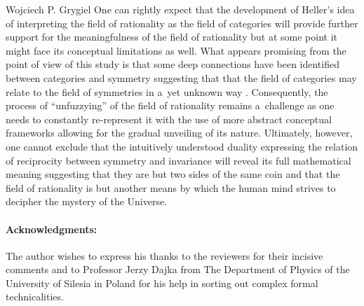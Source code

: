 \begin{artengenv}{Wojciech P. Grygiel}
One can rightly expect that the development of Heller's idea of interpreting the field of rationality as the field of categories will provide further support for the meaningfulness of the field of rationality but at some point it might face its conceptual limitations as well. What appears promising from the point of view of this study is that some deep connections have been identified between categories and symmetry suggesting that that the field of categories may relate to the field of symmetries in a~yet unknown way 
\parencite[e.g][]{heunen_principle_2008}. %
 Consequently, the process of ``unfuzzying'' of the field of rationality remains a~challenge as one needs to constantly re-represent it with the use of more abstract conceptual frameworks allowing for the gradual unveiling of its nature. Ultimately, however, one cannot exclude that the intuitively understood duality expressing the relation of reciprocity between symmetry and invariance will reveal its full mathematical meaning suggesting that they are but two sides of the same coin and that the field of rationality is but another means by which the human mind strives to decipher the mystery of the Universe.


\enlargethispage{1.5\baselineskip}
\paragraph{Acknowledgments:}
The author wishes to express his thanks to the reviewers for their incisive comments and to Professor Jerzy Dajka from The Department of Physics of the University of Silesia in Poland for his help in sorting out complex formal technicalities.



\end{artengenv}
